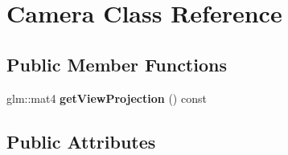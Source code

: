 \hypertarget{class_camera}{}\section{Camera Class Reference}
\label{class_camera}
\subsection*{Public Member Functions}
\begin{DoxyCompactItemize}
\item 
\hypertarget{class_camera_a95833a5b98d52d4be7b7267c8c8490fe}{}glm\+::mat4 {\bfseries get\+View\+Projection} () const \label{class_camera_a95833a5b98d52d4be7b7267c8c8490fe}

\end{DoxyCompactItemize}
\subsection*{Public Attributes}
